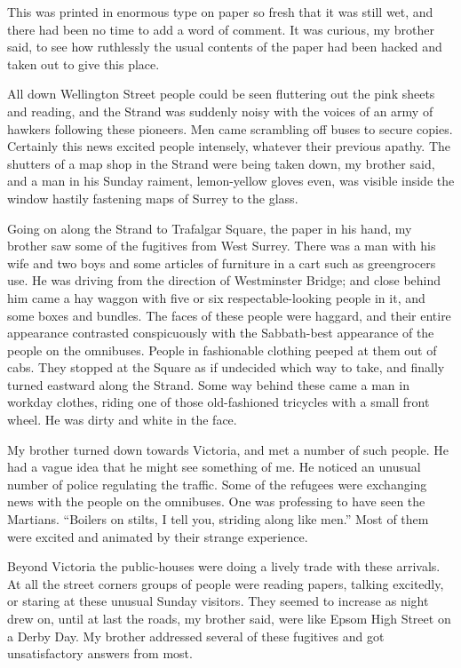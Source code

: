This was printed in enormous type on paper so fresh that it was
still wet, and there had been no time to add a word of comment. It
was curious, my brother said, to see how ruthlessly the usual
contents of the paper had been hacked and taken out to give this
place.

All down Wellington Street people could be seen fluttering out the
pink sheets and reading, and the Strand was suddenly noisy with the
voices of an army of hawkers following these pioneers. Men came
scrambling off buses to secure copies. Certainly this news excited
people intensely, whatever their previous apathy. The shutters of a
map shop in the Strand were being taken down, my brother said, and
a man in his Sunday raiment, lemon-yellow gloves even, was visible
inside the window hastily fastening maps of Surrey to the glass.

Going on along the Strand to Trafalgar Square, the paper in his
hand, my brother saw some of the fugitives from West Surrey. There
was a man with his wife and two boys and some articles of furniture
in a cart such as greengrocers use. He was driving from the
direction of Westminster Bridge; and close behind him came a hay
waggon with five or six respectable-looking people in it, and some
boxes and bundles. The faces of these people were haggard, and
their entire appearance contrasted conspicuously with the
Sabbath-best appearance of the people on the omnibuses. People in
fashionable clothing peeped at them out of cabs. They stopped at
the Square as if undecided which way to take, and finally turned
eastward along the Strand. Some way behind these came a man in
workday clothes, riding one of those old-fashioned tricycles with a
small front wheel. He was dirty and white in the face.

My brother turned down towards Victoria, and met a number of such
people. He had a vague idea that he might see something of me. He
noticed an unusual number of police regulating the traffic. Some of
the refugees were exchanging news with the people on the omnibuses.
One was professing to have seen the Martians. ``Boilers on stilts, I
tell you, striding along like men.'' Most of them were excited and
animated by their strange experience.

Beyond Victoria the public-houses were doing a lively trade with
these arrivals. At all the street corners groups of people were
reading papers, talking excitedly, or staring at these unusual
Sunday visitors. They seemed to increase as night drew on, until at
last the roads, my brother said, were like Epsom High Street on a
Derby Day. My brother addressed several of these fugitives and got
unsatisfactory answers from most.

